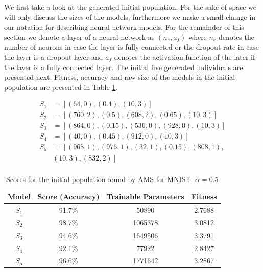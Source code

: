 \documentclass[journal]{IEEEtran}
\begin{document}
We first take a look at the generated initial population. For the sake of space we will only discuss the sizes of the models, furthermore we make a small change in our notation for describing neural network models. For the remainder of this section we denote a layer of a neural network as $(n_e, a_f)$ where $n_e$ denotes the number of neurons in case the layer is fully connected or the dropout rate in case the layer is a dropout layer and $a_f$ denotes the activation function of the later if the layer is a fully connected layer. The initial five generated individuals are presented next. Fitness, accuracy and raw size of the models in the initial population are presented in Table \ref{table:autonn_mnist_initial}.

\begin{align*}
S_1 & = \left[ (64, 0), (0.4), (10, 3) \right] \\
S_2 & = \left[ (760, 2), (0.5), (608, 2), (0.65), (10, 3) \right] \\
S_3 & = \left[ (864, 0), (0.15), (536, 0), (928, 0), (10, 3) \right] \\
S_4 & = \left[ (40,0), (0.45), (912, 0), (10, 3) \right] \\
S_5 & = \left[ (968, 1), (976, 1), (32, 1), (0.15), (808, 1), \right.\\
& \left. (10, 3), (832, 2) \right] \\
\end{align*}

\begin{table}[!htb]
\begin{center}
\begin{tabular}{| c | c | c | c |}
\hline
Model & Score (Accuracy) & Trainable Parameters & Fitness\\
\hline
$S_1$ & 91.7\% & 50890 & 2.7688\\
$S_2$ & 98.7\% & 1065378 & 3.0812\\
$S_3$ & 94.6\% & 1649506 & 3.3791\\
$S_4$ & 92.1\% & 77922 & 2.8427\\
$S_5$ & 96.6\% & 1771642 & 3.2867\\
\hline
\end{tabular}
\end{center}
\caption{Scores for the initial population found by AMS for MNIST. $\alpha = 0.5$}
\label{table:autonn_mnist_initial}
\end{table} 
\end{document}
